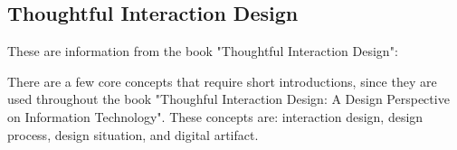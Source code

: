 

\subsection{Thoughtful Interaction Design}

These are information from the book "Thoughtful Interaction Design":

There are a few core concepts that require short introductions, since they are used throughout the book "Thoughful Interaction Design: A Design Perspective on Information Technology". These concepts are: interaction design, design process, design situation, and digital artifact.


